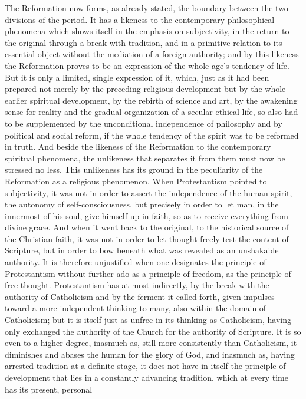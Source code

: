 The Reformation now forms, as already stated, the boundary between the
two divisions of the period. It has a likeness to the contemporary
philosophical phenomena which shows itself in the emphasis on
subjectivity, in the return to the original through a break with
tradition, and in a primitive relation to its essential object without
the mediation of a foreign authority; and by this likeness the
Reformation proves to be an expression of the whole age's tendency of
life. But it is only a limited, single expression of it, which, just
as it had been prepared not merely by the preceding religious
development but by the whole earlier spiritual development, by the
rebirth of science and art, by the awakening sense for reality and the
gradual organization of a secular ethical life, so also had to be
supplemented by the unconditional independence of philosophy and by
political and social reform, if the whole tendency of the spirit was
to be reformed in truth. And beside the likeness of the Reformation to
the contemporary spiritual phenomena, the unlikeness that separates it
from them must now be stressed no less. This unlikeness has its ground
in the peculiarity of the Reformation as a religious phenomenon. When
Protestantism pointed to subjectivity, it was not in order to assert
the independence of the human spirit, the autonomy of
self-consciousness, but precisely in order to let man, in the
innermost of his soul, give himself up in faith, so as to receive
everything from divine grace. And when it went back to the original,
to the historical source of the Christian faith, it was not in order to
let thought freely test the content of Scripture, but in order to bow
beneath what was revealed as an unshakable authority. It is therefore
unjustified when one designates the principle of
Protestantism without further ado as a principle of freedom, as the
principle of free thought. Protestantism has at most indirectly, by the
break with the authority of Catholicism and by the ferment it called
forth, given impulses toward a more independent thinking to many, also
within the domain of Catholicism; but it is itself just as unfree in
its thinking as Catholicism, having only exchanged the authority of the
Church for the authority of Scripture. It is so even to a higher
degree, inasmuch as, still more consistently than Catholicism, it
diminishes and abases the human for the glory of God, and inasmuch as,
having arrested tradition at a definite stage, it does not have in
itself the principle of development that lies in a constantly advancing
tradition, which at every time has its present, personal
